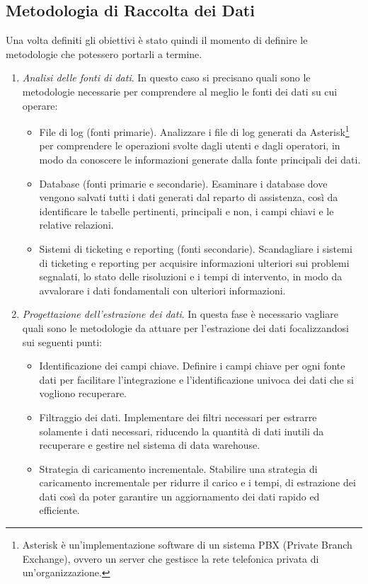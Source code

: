 \subsection{Metodologia di Raccolta dei Dati}
Una volta definiti gli obiettivi è stato quindi il momento di definire le metodologie che potessero portarli a termine.
\begin{enumerate}
    \item \textit{Analisi delle fonti di dati}. In questo caso si precisano quali sono le metodologie necessarie per comprendere al meglio le fonti dei dati su cui operare:
    \begin{itemize}
        \item File di log (fonti primarie). Analizzare i file di log generati da Asterisk\footnote{Asterisk è un'implementazione software di un sistema PBX (Private Branch Exchange), ovvero un server che gestisce la rete telefonica privata di un'organizzazione.} per comprendere le operazioni svolte dagli utenti e dagli operatori, in modo da conoscere le informazioni generate dalla fonte principali dei dati.
        \item Database (fonti primarie e secondarie). Esaminare i database dove vengono salvati tutti i dati generati dal reparto di assistenza, così da identificare le tabelle pertinenti, principali e non, i campi chiavi e le relative relazioni.
        \item Sistemi di ticketing e reporting (fonti secondarie). Scandagliare i sistemi di ticketing e reporting per acquisire informazioni ulteriori sui problemi segnalati, lo stato delle risoluzioni e i tempi di intervento, in modo da avvalorare i dati fondamentali con ulteriori informazioni.
    \end{itemize}
    \item \textit{Progettazione dell'estrazione dei dati}. In questa fase è necessario vagliare quali sono le metodologie da attuare per l'estrazione dei dati focalizzandosi sui seguenti punti:
    \begin{itemize}
        \item Identificazione dei campi chiave. Definire i campi chiave per ogni fonte dati per facilitare l'integrazione e l'identificazione univoca dei dati che si vogliono recuperare.
        \item Filtraggio dei dati. Implementare dei filtri necessari per estrarre solamente i dati necessari, riducendo la quantità di dati inutili da recuperare e gestire nel sistema di data warehouse.
        \item Strategia di caricamento incrementale. Stabilire una strategia di caricamento incrementale per ridurre il carico e i tempi, di estrazione dei dati così da poter garantire un aggiornamento dei dati rapido ed efficiente.

\end{itemize}
\end{enumerate}
